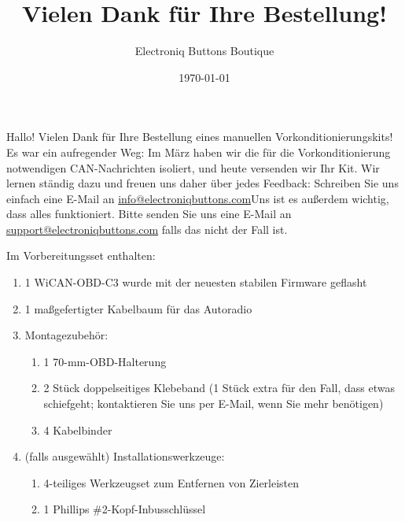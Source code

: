 \documentclass[superscriptaddress,onecolumn,floatfix]{revtex4-2}
\makeatletter
\DeclareRobustCommand{\selectlanguage}[1]{%
    \@ifundefined{alias@\string#1}
      {\ORIGselectlanguage{#1}}
      {\begingroup\edef\x{\endgroup
         \noexpand\ORIGselectlanguage{\@nameuse{alias@#1}}}\x}%
}
\makeatother
\begin{document}
\selectlanguage{de}

\title{Vielen Dank für Ihre Bestellung!}
\author{Electroniq Buttons Boutique}
\date{\today}

\maketitle

Hallo! Vielen Dank für Ihre Bestellung eines manuellen Vorkonditionierungskits! Es war ein aufregender Weg: Im März haben wir die für die Vorkonditionierung notwendigen CAN-Nachrichten isoliert, und heute versenden wir Ihr Kit. Wir lernen ständig dazu und freuen uns daher über jedes Feedback: Schreiben Sie uns einfach eine E-Mail an \href{mailto:info@electroniqbuttons.com}{info@electroniqbuttons.com}Uns ist es außerdem wichtig, dass alles funktioniert. Bitte senden Sie uns eine E-Mail an \href{mailto:support@electroniqbuttons.com}{support@electroniqbuttons.com} falls das nicht der Fall ist. 

Im Vorbereitungsset enthalten:
{\small
\begin{enumerate}
  \item 1 WiCAN-OBD-C3 wurde mit der neuesten stabilen Firmware geflasht
  \item 1 maßgefertigter Kabelbaum für das Autoradio
  \item Montagezubehör: 
    \begin{enumerate}
      \item 1 70-mm-OBD-Halterung
      \item 2 Stück doppelseitiges Klebeband (1 Stück extra für den Fall, dass etwas schiefgeht; kontaktieren Sie uns per E-Mail, wenn Sie mehr benötigen)
      \item 4 Kabelbinder
    \end{enumerate}
  \item (falls ausgewählt) Installationswerkzeuge:
    \begin{enumerate}
      \item 4-teiliges Werkzeugset zum Entfernen von Zierleisten
      \item 1 Phillips \#2-Kopf-Inbusschlüssel
    \end{enumerate}
\end{enumerate}
}
\end{document}
